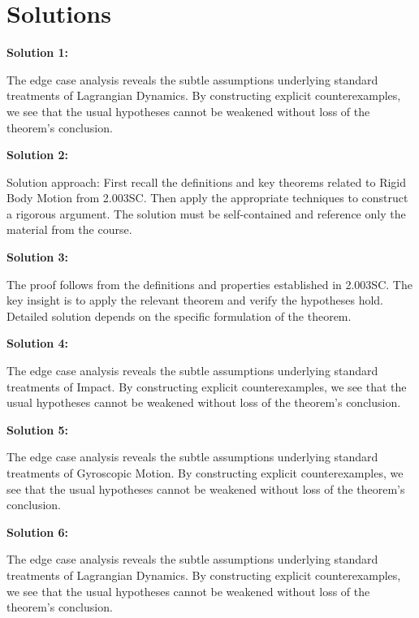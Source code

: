 \documentclass[12pt,a4paper]{exam}
\begin{document}
\newpage
\section*{Solutions}

\textbf{Solution 1:}

The edge case analysis reveals the subtle assumptions underlying standard treatments of Lagrangian Dynamics. By constructing explicit counterexamples, we see that the usual hypotheses cannot be weakened without loss of the theorem's conclusion.

\vspace{0.5cm}

\textbf{Solution 2:}

Solution approach: First recall the definitions and key theorems related to Rigid Body Motion from 2.003SC. Then apply the appropriate techniques to construct a rigorous argument. The solution must be self-contained and reference only the material from the course.

\vspace{0.5cm}

\textbf{Solution 3:}

The proof follows from the definitions and properties established in 2.003SC. The key insight is to apply the relevant theorem and verify the hypotheses hold. Detailed solution depends on the specific formulation of the theorem.

\vspace{0.5cm}

\textbf{Solution 4:}

The edge case analysis reveals the subtle assumptions underlying standard treatments of Impact. By constructing explicit counterexamples, we see that the usual hypotheses cannot be weakened without loss of the theorem's conclusion.

\vspace{0.5cm}

\textbf{Solution 5:}

The edge case analysis reveals the subtle assumptions underlying standard treatments of Gyroscopic Motion. By constructing explicit counterexamples, we see that the usual hypotheses cannot be weakened without loss of the theorem's conclusion.

\vspace{0.5cm}

\textbf{Solution 6:}

The edge case analysis reveals the subtle assumptions underlying standard treatments of Lagrangian Dynamics. By constructing explicit counterexamples, we see that the usual hypotheses cannot be weakened without loss of the theorem's conclusion.
\end{document}
